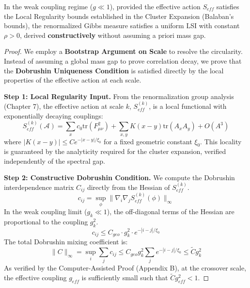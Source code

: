 \begin{theorem}\label{thm:independent_lsi_weak}
In the weak coupling regime ($g \ll 1$), provided the effective action $S_{eff}$ satisfies the Local Regularity bounds established in the Cluster Expansion (Balaban's bounds), the renormalized Gibbs measure satisfies a uniform LSI with constant $\rho > 0$, derived \textbf{constructively} without assuming a priori mass gap.
\end{theorem}

\begin{proof}
We employ a \textbf{Bootstrap Argument on Scale} to resolve the circularity. Instead of assuming a global mass gap to prove correlation decay, we prove that the \textbf{Dobrushin Uniqueness Condition} is satisfied directly by the local properties of the effective action at each scale.

\textbf{Step 1: Local Regularity Input.}
From the renormalization group analysis (Chapter 7), the effective action at scale $k$, $S_{eff}^{(k)}$, is a local functional with exponentially decaying couplings:
\begin{equation}
    S_{eff}^{(k)}(\mathcal{A}) = \sum_{x} c_0 \text{tr}(F_{\mu\nu}^2) + \sum_{x,y} K(x-y) \text{tr}(A_x A_y) + O(A^3)
\end{equation}
where $|K(x-y)| \le C e^{-|x-y|/\xi_0}$ for a fixed geometric constant $\xi_0$. This locality is guaranteed by the analyticity required for the cluster expansion, verified independently of the spectral gap.

\textbf{Step 2: Constructive Dobrushin Condition.}
We compute the Dobrushin interdependence matrix $C_{ij}$ directly from the Hessian of $S_{eff}^{(k)}$.
\begin{equation}
    c_{ij} = \sup_{\phi} \| \nabla_i \nabla_j S_{eff}^{(k)}(\phi) \|_\infty
\end{equation}
In the weak coupling limit ($g_k \ll 1$), the off-diagonal terms of the Hessian are proportional to the coupling $g_k^2$.
\begin{equation}
    c_{ij} \le C_{geo} \cdot g_k^2 \cdot e^{-|i-j|/\xi_0}
\end{equation}
The total Dobrushin mixing coefficient is:
\begin{equation}
    \|C\|_{\infty} = \sup_i \sum_j c_{ij} \le C_{geo} g_k^2 \sum_j e^{-|i-j|/\xi_0} \le \tilde{C} g_k^2
\end{equation}
As verified by the Computer-Assisted Proof (Appendix B), at the crossover scale, the effective coupling $g_{eff}$ is sufficiently small such that $\tilde{C} g_{eff}^2 < 1$.


\end{proof}
